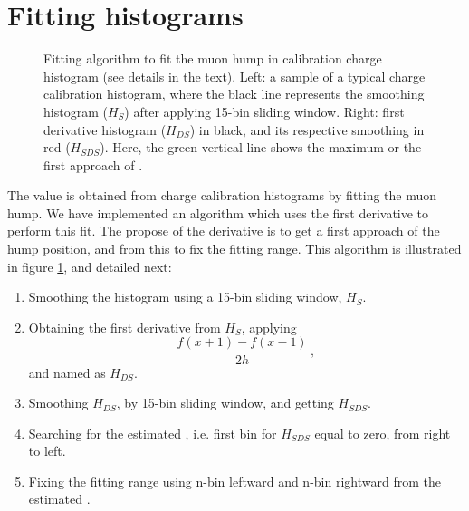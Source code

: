 \documentclass[twoside, final, 10pt]{articleMine}
\begin{document}
\section{Fitting histograms}
\label{secFitting}

\begin{figure}[!t]
  \label{figChargeDerivative}
  \centering
  \caption{Fitting algorithm to fit the muon hump in calibration
  charge histogram (see details in the text). Left: a sample of a
  typical charge calibration histogram, where the black line
  represents the smoothing histogram ($H_S$) after applying
  15-bin sliding window. Right: first derivative histogram
  ($H_{DS}$) in black, and its respective smoothing in red
  ($H_{SDS}$). Here, the green vertical line shows the maximum or
  the first approach of \qpkvem.}
\end{figure}

The \qpkvem value is obtained from charge calibration histograms
by fitting the muon hump. We have implemented an algorithm which
uses the first derivative to perform this fit. The propose of
the derivative is to get a first approach of the hump position,
and from this to fix the fitting range. This algorithm is
illustrated in figure \ref{figChargeDerivative}, and detailed
next:
\begin{enumerate}
  \item Smoothing the histogram using a 15-bin sliding window,
    $H_S$.
  \item Obtaining the first derivative from $H_S$, applying
    \begin{equation}
      \frac{f(x+1)-f(x-1)}{2h} \, ,
    \end{equation}
    and named as $H_{DS}$.
  \item Smoothing $H_{DS}$, by 15-bin sliding window, and
    getting $H_{SDS}$.
  \item Searching for the estimated \qpkvem, i.e. first bin for
    $H_{SDS}$ equal to zero, from right to left.
  \item Fixing the fitting range using n-bin leftward and n-bin
    rightward from the estimated \qpkvem.
\end{enumerate}
\clearpage 
\end{document}
